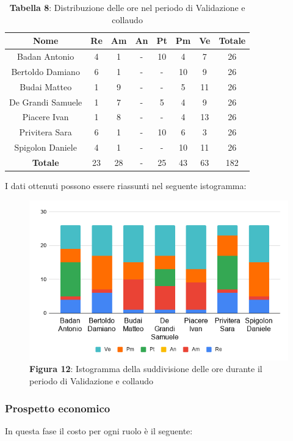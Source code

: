 \begin{table}[H]
	\centering
	\renewcommand{\arraystretch}{1.5}
	\begin{tabular}{|c|c|c|c|c|c|c|c|}
		\hline
		\rowcolor{lighter-grayer}
Nome & Re & Am & An & Pt & Pm & Ve & Totale \\ \hline
Badan Antonio & 4 & 1 & - & 10 & 4 & 7 & 26 \\ \hline
Bertoldo Damiano & 6 & 1 & - & - & 10 & 9 & 26 \\ \hline
Budai Matteo & 1 & 9 & - & - & 5 & 11 & 26 \\ \hline
De Grandi Samuele & 1 & 7 & - & 5 & 4 & 9 & 26 \\ \hline
Piacere Ivan & 1 & 8 & - & - & 4 & 13 & 26 \\ \hline
Privitera Sara & 6 & 1 & - & 10 & 6 & 3 & 26 \\ \hline
Spigolon Daniele & 4 & 1 & - & - & 10 & 11 & 26 \\ \hline
\textbf{Totale} & 23 & 28 & - & 25 & 43 & 63 & 182 \\ \hline
	\end{tabular}
	\caption*{\textbf{Tabella 8}: Distribuzione delle ore nel periodo di Validazione e collaudo\\}
\end{table}	
	I dati ottenuti possono essere riassunti nel seguente istogramma:

\begin{figure}[H]
	\centering
	\includegraphics[width=0.7\linewidth]{res/images/IstogrammaFase4.png}
	\caption*{\textbf{Figura 12}: Istogramma della suddivisione delle ore durante il periodo di Validazione e collaudo}
	\label{fig:Figura10}
\end{figure}
	
	
\subsubsection{Prospetto economico}
In questa fase il costo per ogni ruolo è il seguente:

